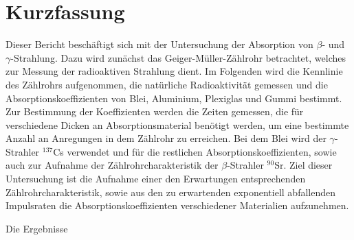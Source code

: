 \section{Kurzfassung}

Dieser Bericht beschäftigt sich mit der Untersuchung der Absorption von $\beta$- und $\gamma$-Strahlung.
Dazu wird zunächst das Geiger-Müller-Zählrohr betrachtet, welches zur Messung der radioaktiven Strahlung dient.
Im Folgenden wird die Kennlinie des Zählrohrs aufgenommen, die natürliche Radioaktivität gemessen und die Absorptionskoeffizienten von Blei, Aluminium, Plexiglas und Gummi bestimmt.
Zur Bestimmung der Koeffizienten werden die Zeiten gemessen, die für verschiedene Dicken an Absorptionsmaterial benötigt werden, um eine bestimmte Anzahl an Anregungen in dem Zählrohr zu erreichen.
Bei dem Blei wird der $\gamma$-Strahler $^{137}$Cs verwendet und für die restlichen Absorptionskoeffizienten, sowie auch zur Aufnahme der Zählrohrcharakteristik der $\beta$-Strahler $^{90}$Sr.
Ziel dieser Untersuchung ist die Aufnahme einer den Erwartungen entsprechenden Zählrohrcharakteristik, sowie aus den zu erwartenden exponentiell abfallenden Impulsraten die Absorptionskoeffizienten verschiedener Materialien aufzunehmen.

Die Ergebnisse %
